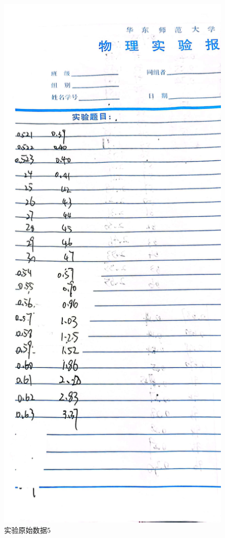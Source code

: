 \documentclass{ctexart}
\begin{document}
\begin{figure}[H]
  \centering
  \includegraphics[width=1\textwidth,height=0.8\textheight]{putong2.jpg}
  \caption{实验原始数据5}\label{putong2}
\end{figure}
\newpage
\end{document}
